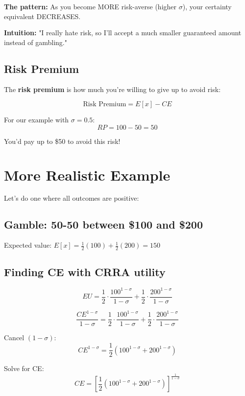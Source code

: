 \documentclass[12pt]{article}
\begin{document}
\vspace{0.5cm}

\textbf{The pattern:} As you become MORE risk-averse (higher $\sigma$), your certainty equivalent DECREASES.

\vspace{0.3cm}

\textbf{Intuition:} "I really hate risk, so I'll accept a much smaller guaranteed amount instead of gambling."

\subsection*{Risk Premium}

The \textbf{risk premium} is how much you're willing to give up to avoid risk:

\[
\text{Risk Premium} = E[x] - CE
\]

For our example with $\sigma = 0.5$:
\[
RP = 100 - 50 = 50
\]

You'd pay up to \$50 to avoid this risk!

\section*{More Realistic Example}

Let's do one where all outcomes are positive:

\subsection*{Gamble: 50-50 between \$100 and \$200}

Expected value: $E[x] = \frac{1}{2}(100) + \frac{1}{2}(200) = 150$

\subsection*{Finding CE with CRRA utility}

\[
EU = \frac{1}{2} \cdot \frac{100^{1-\sigma}}{1-\sigma} + \frac{1}{2} \cdot \frac{200^{1-\sigma}}{1-\sigma}
\]

\[
\frac{CE^{1-\sigma}}{1-\sigma} = \frac{1}{2} \cdot \frac{100^{1-\sigma}}{1-\sigma} + \frac{1}{2} \cdot \frac{200^{1-\sigma}}{1-\sigma}
\]

Cancel $(1-\sigma)$:
\[
CE^{1-\sigma} = \frac{1}{2} \left(100^{1-\sigma} + 200^{1-\sigma}\right)
\]

Solve for CE:
\[
CE = \left[\frac{1}{2} \left(100^{1-\sigma} + 200^{1-\sigma}\right)\right]^{\frac{1}{1-\sigma}}
\]
\end{document}
